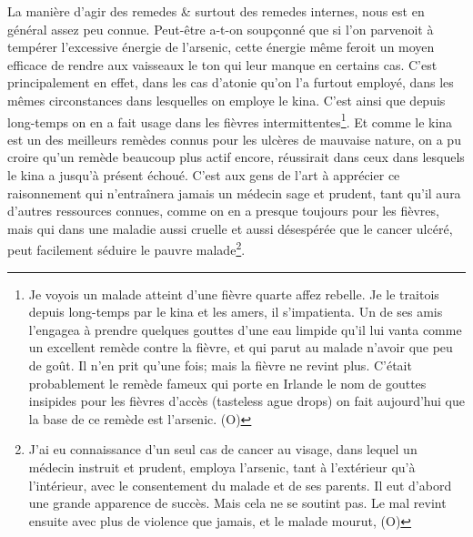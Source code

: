 La manière d'agir des remedes & surtout des remedes internes, nous est en général assez peu connue. Peut-être a-t-on soupçonné que si l'on parvenoit à tempérer l'excessive énergie de l'arsenic, cette énergie même feroit un moyen efficace de rendre aux vaisseaux le ton qui leur manque en certains cas. C'est principalement en effet, dans les cas d'atonie qu'on l'a furtout employé, dans les mêmes circonstances dans lesquelles on employe le kina. C'est ainsi que depuis long-temps on en a fait usage dans les fièvres intermittentes\footnote{Je voyois un malade atteint d'une fièvre quarte affez rebelle. Je le traitois depuis long-temps par le kina et les amers, il s'impatienta. Un de ses amis l'engagea à prendre quelques gouttes d'une eau limpide qu'il lui vanta comme un excellent remède contre la fièvre, et qui parut au malade n'avoir que peu de goût. Il n'en prit qu'une fois; mais la fièvre ne revint plus. C'était probablement le remède fameux qui porte en Irlande le nom de gouttes insipides pour les fièvres d'accès (tasteless ague drops) on fait aujourd'hui que la base de ce remède est l'arsenic. (O)}. Et comme\setcounter{page}{327} le kina est un des meilleurs remèdes connus pour les ulcères de mauvaise nature, on a pu croire qu'un remède beaucoup plus actif encore, réussirait dans ceux dans lesquels le kina a jusqu'à présent échoué. C'est aux gens de l'art à apprécier ce raisonnement qui n'entraînera jamais un médecin sage et prudent, tant qu'il aura d'autres ressources connues, comme on en a presque toujours pour les fièvres, mais qui dans une maladie aussi cruelle et aussi désespérée que le cancer ulcéré, peut facilement séduire le pauvre malade\footnote{J'ai eu connaissance d'un seul cas de cancer au visage, dans lequel un médecin instruit et prudent, employa l'arsenic, tant à l'extérieur qu'à l'intérieur, avec le consentement du malade et de ses parents. Il eut d'abord une grande apparence de succès. Mais cela ne se soutint pas. Le mal revint ensuite avec plus de violence que jamais, et le malade mourut, (O)}.
